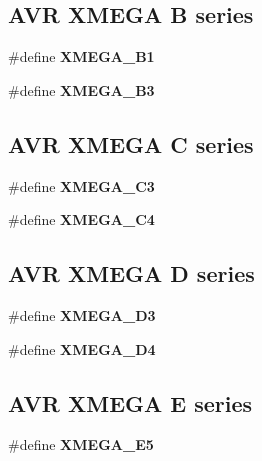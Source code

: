 \subsection*{A\+V\+R X\+M\+E\+G\+A B series}
\begin{DoxyCompactItemize}
\item 
\#define {\bfseries X\+M\+E\+G\+A\+\_\+\+B1}
\item 
\#define {\bfseries X\+M\+E\+G\+A\+\_\+\+B3}
\end{DoxyCompactItemize}
\subsection*{A\+V\+R X\+M\+E\+G\+A C series}
\begin{DoxyCompactItemize}
\item 
\#define {\bfseries X\+M\+E\+G\+A\+\_\+\+C3}
\item 
\#define {\bfseries X\+M\+E\+G\+A\+\_\+\+C4}
\end{DoxyCompactItemize}
\subsection*{A\+V\+R X\+M\+E\+G\+A D series}
\begin{DoxyCompactItemize}
\item 
\#define {\bfseries X\+M\+E\+G\+A\+\_\+\+D3}
\item 
\#define {\bfseries X\+M\+E\+G\+A\+\_\+\+D4}
\end{DoxyCompactItemize}
\subsection*{A\+V\+R X\+M\+E\+G\+A E series}
\begin{DoxyCompactItemize}
\item 
\#define {\bfseries X\+M\+E\+G\+A\+\_\+\+E5}
\end{DoxyCompactItemize}
